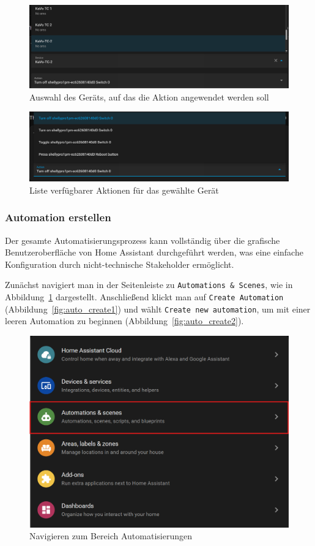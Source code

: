 \begin{figure}[H]
    \centering
    \includegraphics[width=\linewidth]{images/auto_action3.png}
    \caption{Auswahl des Geräts, auf das die Aktion angewendet werden soll}
\end{figure}

\begin{figure}[H]
    \centering
    \includegraphics[width=\linewidth]{images/auto_trigaction4.png}
    \caption{Liste verfügbarer Aktionen für das gewählte Gerät}
\end{figure}

\subsubsection{Automation erstellen}
Der gesamte Automatisierungsprozess kann vollständig über die grafische Benutzeroberfläche von Home Assistant durchgeführt werden, was eine einfache Konfiguration durch nicht-technische Stakeholder ermöglicht.

Zunächst navigiert man in der Seitenleiste zu \texttt{Automations \& Scenes}, wie in Abbildung~\ref{fig:auto_find} dargestellt. Anschließend klickt man auf \texttt{Create Automation} (Abbildung~\ref{fig:auto_create1}) und wählt \texttt{Create new automation}, um mit einer leeren Automation zu beginnen (Abbildung~\ref{fig:auto_create2}).

\begin{figure}[H]
    \centering
    \includegraphics[width=0.7\linewidth]{images/auto_find.png}
    \caption{Navigieren zum Bereich Automatisierungen}
    \label{fig:auto_find}
\end{figure}

